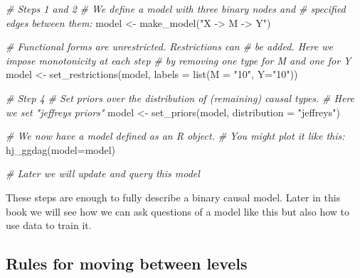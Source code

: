 \documentclass[
  12pt,
]{book}
\newenvironment{Shaded}{\begin{snugshade}}{\end{snugshade}}
\newcommand{\AttributeTok}[1]{\textcolor[rgb]{0.77,0.63,0.00}{#1}}
\newcommand{\CommentTok}[1]{\textcolor[rgb]{0.56,0.35,0.01}{\textit{#1}}}
\newcommand{\FunctionTok}[1]{\textcolor[rgb]{0.00,0.00,0.00}{#1}}
\newcommand{\NormalTok}[1]{#1}
\newcommand{\OtherTok}[1]{\textcolor[rgb]{0.56,0.35,0.01}{#1}}
\newcommand{\StringTok}[1]{\textcolor[rgb]{0.31,0.60,0.02}{#1}}
\begin{document}
\begin{Shaded}
\begin{Highlighting}[]
\CommentTok{\# Steps 1 and 2 }
\CommentTok{\# We define a model with three binary nodes and }
\CommentTok{\# specified edges between them:}
\NormalTok{model }\OtherTok{\textless{}{-}} \FunctionTok{make\_model}\NormalTok{(}\StringTok{"X {-}\textgreater{} M {-}\textgreater{} Y"}\NormalTok{)}

\CommentTok{\# Functional forms are unrestricted. Restrictions can }
\CommentTok{\# be added. Here we impose monotonicity at each step }
\CommentTok{\# by removing one type for M and one for Y}
\NormalTok{model }\OtherTok{\textless{}{-}} \FunctionTok{set\_restrictions}\NormalTok{(model, }\AttributeTok{labels =} \FunctionTok{list}\NormalTok{(}\AttributeTok{M =} \StringTok{"10"}\NormalTok{, }\AttributeTok{Y=}\StringTok{"10"}\NormalTok{))}

\CommentTok{\# Step 4}
\CommentTok{\# Set priors over the distribution of (remaining) causal types.}
\CommentTok{\# Here we set "jeffreys priors"}
\NormalTok{model }\OtherTok{\textless{}{-}} \FunctionTok{set\_priors}\NormalTok{(model, }\AttributeTok{distribution =} \StringTok{"jeffreys"}\NormalTok{)}

\CommentTok{\# We now have a model defined as an R object. }
\CommentTok{\# You might plot it like this:}
\FunctionTok{hj\_ggdag}\NormalTok{(}\AttributeTok{model=}\NormalTok{model)}

\CommentTok{\# Later we will update  and query this model}
\end{Highlighting}
\end{Shaded}

These steps are enough to fully describe a binary causal model. Later in this book we will see how we can ask questions of a model like this but also how to use data to train it.

\hypertarget{rules-for-moving-between-levels}{%
\subsection{Rules for moving between levels}\label{rules-for-moving-between-levels}}
\end{document}
